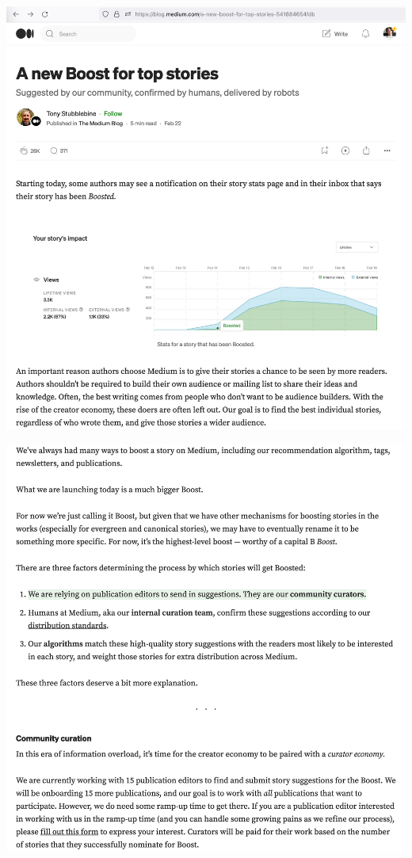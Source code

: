 
\begin{center}
    \includegraphics[width=\textwidth]{medium-boost-original-p1}
\end{center}
\WillContinue
\pagebreak

\Continuing
\begin{center}
    \includegraphics[width=\textwidth]{medium-boost-original-p2}
\end{center}

\pagebreak
